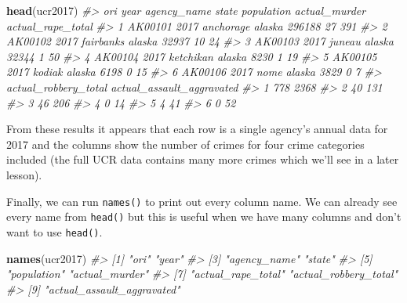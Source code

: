 \documentclass[
  12pt,
]{book}
\newenvironment{Shaded}{\begin{snugshade}}{\end{snugshade}}
\newcommand{\CommentTok}[1]{\textcolor[rgb]{0.37,0.37,0.37}{\textit{#1}}}
\newcommand{\KeywordTok}[1]{\textcolor[rgb]{0.27,0.27,0.27}{\textbf{#1}}}
\newcommand{\NormalTok}[1]{#1}
\begin{document}
\begin{Shaded}
\begin{Highlighting}[]
\KeywordTok{head}\NormalTok{(ucr2017)}
\CommentTok{\#\textgreater{}       ori year agency\_name  state population actual\_murder actual\_rape\_total}
\CommentTok{\#\textgreater{} 1 AK00101 2017   anchorage alaska     296188            27               391}
\CommentTok{\#\textgreater{} 2 AK00102 2017   fairbanks alaska      32937            10                24}
\CommentTok{\#\textgreater{} 3 AK00103 2017      juneau alaska      32344             1                50}
\CommentTok{\#\textgreater{} 4 AK00104 2017   ketchikan alaska       8230             1                19}
\CommentTok{\#\textgreater{} 5 AK00105 2017      kodiak alaska       6198             0                15}
\CommentTok{\#\textgreater{} 6 AK00106 2017        nome alaska       3829             0                 7}
\CommentTok{\#\textgreater{}   actual\_robbery\_total actual\_assault\_aggravated}
\CommentTok{\#\textgreater{} 1                  778                      2368}
\CommentTok{\#\textgreater{} 2                   40                       131}
\CommentTok{\#\textgreater{} 3                   46                       206}
\CommentTok{\#\textgreater{} 4                    0                        14}
\CommentTok{\#\textgreater{} 5                    4                        41}
\CommentTok{\#\textgreater{} 6                    0                        52}
\end{Highlighting}
\end{Shaded}

From these results it appears that each row is a single agency's annual data for 2017 and the columns show the number of crimes for four crime categories included (the full UCR data contains many more crimes which we'll see in a later lesson).

Finally, we can run \texttt{names()} to print out every column name. We can already see every name from \texttt{head()} but this is useful when we have many columns and don't want to use \texttt{head()}.

\begin{Shaded}
\begin{Highlighting}[]
\KeywordTok{names}\NormalTok{(ucr2017)}
\CommentTok{\#\textgreater{} [1] "ori"                       "year"                     }
\CommentTok{\#\textgreater{} [3] "agency\_name"               "state"                    }
\CommentTok{\#\textgreater{} [5] "population"                "actual\_murder"            }
\CommentTok{\#\textgreater{} [7] "actual\_rape\_total"         "actual\_robbery\_total"     }
\CommentTok{\#\textgreater{} [9] "actual\_assault\_aggravated"}
\end{Highlighting}
\end{Shaded}
\end{document}
